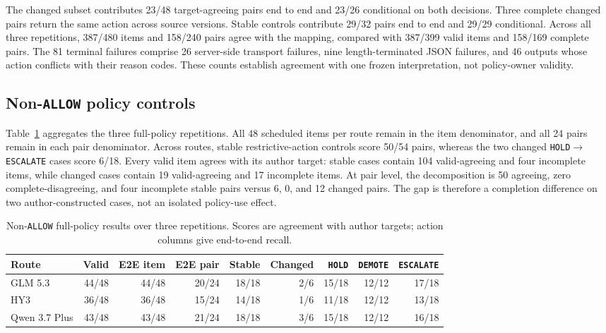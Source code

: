 \documentclass[10pt]{article}
\newcommand{\allow}{\texttt{ALLOW}}
\newcommand{\hold}{\texttt{HOLD}}
\newcommand{\demote}{\texttt{DEMOTE}}
\newcommand{\escalate}{\texttt{ESCALATE}}
\begin{document}
The changed subset contributes 23/48 target-agreeing pairs end to end and 23/26 conditional on both
decisions. Three complete changed pairs return the same action across source versions. Stable
controls contribute 29/32 pairs end to end and 29/29 conditional. Across all three repetitions,
387/480 items and 158/240 pairs agree with the mapping, compared with 387/399 valid items and
158/169 complete pairs. The 81 terminal failures comprise 26 server-side transport failures, nine
length-terminated JSON failures, and 46 outputs whose action conflicts with their reason codes.
These counts establish agreement with one frozen interpretation, not policy-owner validity.

\subsection{Non-\allow{} policy controls}

Table~\ref{tab:nonallow-routes} aggregates the three full-policy repetitions. All 48 scheduled
items per route remain in the item denominator, and all 24 pairs remain in each pair denominator.
Across routes, stable restrictive-action controls score 50/54 pairs, whereas the two changed
\hold$\rightarrow$\escalate{} cases score 6/18. Every valid item agrees with its author target:
stable cases contain 104 valid-agreeing and four incomplete items, while changed cases contain 19
valid-agreeing and 17 incomplete items. At pair level, the decomposition is 50 agreeing, zero
complete-disagreeing, and four incomplete stable pairs versus 6, 0, and 12 changed pairs. The gap is
therefore a completion difference on two author-constructed cases, not an isolated policy-use effect.

\begin{table}[H]
\centering
\scriptsize
\setlength{\tabcolsep}{2.7pt}
\caption{Non-\allow{} full-policy results over three repetitions. Scores are agreement with author
targets; action columns give end-to-end recall.}
\label{tab:nonallow-routes}
\begin{tabular}{@{}lrrrrrrrr@{}}
\toprule
Route & Valid & E2E item & E2E pair & Stable & Changed & \hold{} & \demote{} & \escalate{} \\
\midrule
GLM 5.3 & 44/48 & 44/48 & 20/24 & 18/18 & 2/6 & 15/18 & 12/12 & 17/18 \\
HY3 & 36/48 & 36/48 & 15/24 & 14/18 & 1/6 & 11/18 & 12/12 & 13/18 \\
Qwen 3.7 Plus & 43/48 & 43/48 & 21/24 & 18/18 & 3/6 & 15/18 & 12/12 & 16/18 \\
\bottomrule
\end{tabular}
\end{table}
\end{document}
